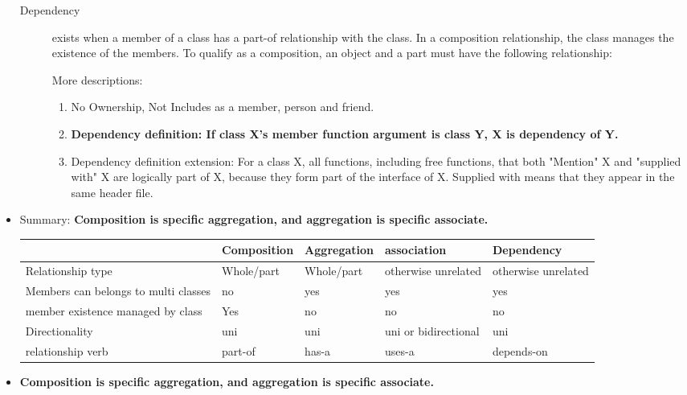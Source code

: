 \documentclass[a4paper,11pt,twoside]{book}
\newcommand{\tophline}{\hline }
\newcommand{\bottomhline}{\\ \hline }
\newcommand{\tophline}{ }
\newcommand{\bottomhline}{ }
\begin{document}
\begin{itemize}
\begin{description}
	\item[Dependency ] exists when a member of a class has a part-of relationship with the class. In a composition relationship, the class manages the existence of the members. To qualify as a composition, an object and a part must have the following relationship:
	
	More descriptions:
	\begin{enumerate}
		\item No Ownership, Not Includes as a member, person and friend.
		
		\item \textbf{Dependency definition: If class X's member function argument is class Y, X is dependency of Y.}
		
		\item Dependency definition extension: For a class X, all functions, including free functions, that both "Mention" X and "supplied with" X are logically part of X, because they form part of the interface of X. Supplied with means that they appear in the same header file.
	\end{enumerate}
	

	\end{description}
	
	\item Summary: \textbf{Composition is specific aggregation, and aggregation is specific associate.}
	
\begin{center}
	\begin{tabular}{|p{}|p{}|p{}|p{}|p{}|}
		\tophline 
		 & Composition  & Aggregation  & association & Dependency \\ 
		\tophline 
		Relationship type& Whole/part  & Whole/part  & otherwise unrelated  & otherwise unrelated  \\ 
		\tophline 
		Members can belongs to multi classes& no  & yes & yes & yes  \\ 
		\tophline 
		member existence managed by class& Yes & no & no   & no \\ 
		\tophline 
		Directionality & uni  & uni & uni or bidirectional & uni  \\ 
		\tophline 
		relationship verb& part-of & has-a & uses-a & depends-on 
		\bottomhline 
	\end{tabular}
\end{center}

	\item \textbf{Composition is specific aggregation, and aggregation is specific associate.}


\end{itemize}
\end{document}
